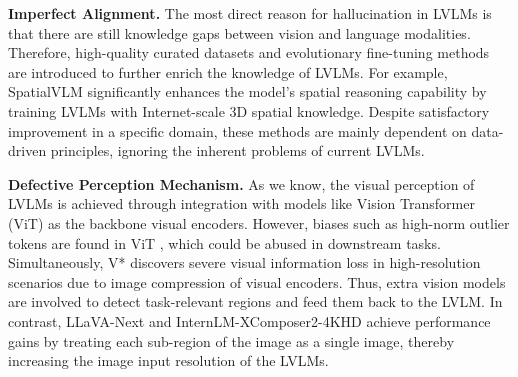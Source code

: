 \textbf{Imperfect Alignment.} 
The most direct reason for hallucination in LVLMs is that there are still knowledge gaps between vision and language modalities. Therefore, high-quality curated datasets \cite{liu2024improved-llava, gunjal2024fdpo, wu2024q-instruct} and evolutionary fine-tuning methods \cite{hu2022lora, yu2024rlhf, wu2024reft} are introduced to further enrich the knowledge of LVLMs. 
For example, SpatialVLM \cite{chen2024spatialvlm} significantly enhances the model's spatial reasoning capability by training LVLMs with Internet-scale 3D spatial knowledge. Despite satisfactory improvement in a specific domain, these methods are mainly dependent on data-driven principles, ignoring the inherent problems of current LVLMs.

\textbf{Defective Perception Mechanism.}
As we know, the visual perception of LVLMs is achieved through integration with models like Vision Transformer (ViT) \cite{dosovitskiy2020vit} as the backbone visual encoders. However, biases such as high-norm outlier tokens are found in ViT \cite{darcet2024vit-flaw}, which could be abused in downstream tasks. Simultaneously, V* \cite{wu2024vstar} discovers severe visual information loss in high-resolution scenarios due to image compression of visual encoders. Thus, extra vision models are involved to detect task-relevant regions and feed them back to the LVLM. In contrast, LLaVA-Next \cite{liu2024llavanext} and InternLM-XComposer2-4KHD \cite{dong2024internlmxcomposerhd} achieve performance gains by treating each sub-region of the image as a single image, thereby increasing the image input resolution of the LVLMs. 

